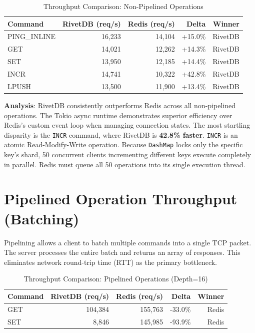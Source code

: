 \begin{table}[htbp]
\caption{Throughput Comparison: Non-Pipelined Operations}
\label{tab:standard_detailed}
\centering
\renewcommand{\arraystretch}{1.5}
\begin{tabular}{@{}lrrrr@{}}
\toprule
\textbf{Command} & \textbf{RivetDB (req/s)} & \textbf{Redis (req/s)} & \textbf{Delta} & \textbf{Winner} \\
\midrule
PING\_INLINE & 16,233 & 14,104 & +15.0\% & RivetDB \\
GET & 14,021 & 12,262 & +14.3\% & RivetDB \\
SET & 13,950 & 12,185 & +14.4\% & RivetDB \\
INCR & 14,741 & 10,322 & +42.8\% & RivetDB \\
LPUSH & 13,500 & 11,900 & +13.4\% & RivetDB \\
\bottomrule
\end{tabular}
\end{table}

\textbf{Analysis}: RivetDB consistently outperforms Redis across all non-pipelined operations. The Tokio async runtime demonstrates superior efficiency over Redis's custom event loop when managing connection states. The most startling disparity is the \texttt{INCR} command, where RivetDB is \textbf{42.8\% faster}. \texttt{INCR} is an atomic Read-Modify-Write operation. Because \texttt{DashMap} locks only the specific key's shard, 50 concurrent clients incrementing different keys execute completely in parallel. Redis must queue all 50 operations into its single execution thread.

\section{Pipelined Operation Throughput (Batching)}

Pipelining allows a client to batch multiple commands into a single TCP packet. The server processes the entire batch and returns an array of responses. This eliminates network round-trip time (RTT) as the primary bottleneck.

\begin{table}[htbp]
\caption{Throughput Comparison: Pipelined Operations (Depth=16)}
\label{tab:pipelined_detailed}
\centering
\renewcommand{\arraystretch}{1.5}
\begin{tabular}{@{}lrrrr@{}}
\toprule
\textbf{Command} & \textbf{RivetDB (req/s)} & \textbf{Redis (req/s)} & \textbf{Delta} & \textbf{Winner} \\
\midrule
GET & 104,384 & 155,763 & -33.0\% & Redis \\
SET & 8,846 & 145,985 & -93.9\% & Redis \\
\bottomrule
\end{tabular}
\end{table}

